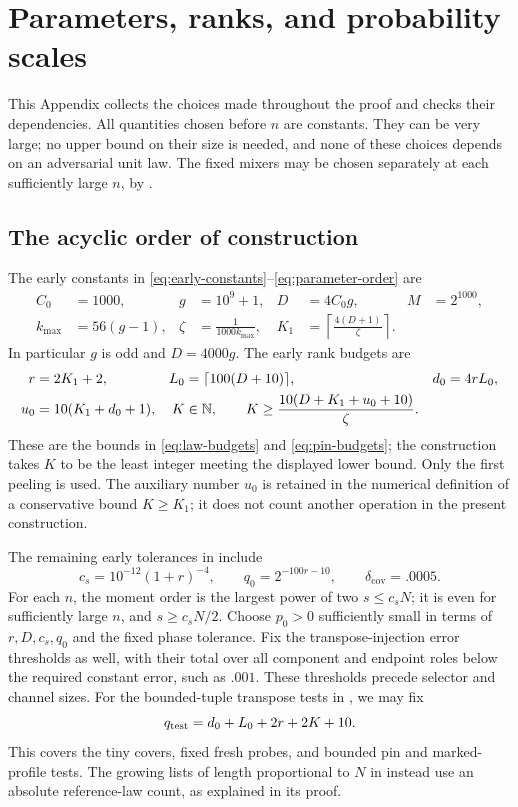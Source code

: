 \section{Parameters, ranks, and probability scales}
\label{sec:parameters}

This Appendix collects the choices made throughout the proof and
checks their dependencies. All quantities chosen before \(n\) are
constants. They can be very large; no upper bound on their size is
needed, and none of these choices depends on an adversarial unit law.
The fixed mixers may be chosen separately at each sufficiently large
\(n\), by .

\subsection{The acyclic order of construction}

The early constants in
\eqref{eq:early-constants}--\eqref{eq:parameter-order} are
\begin{align}
 C_0&=1000,& g&=10^9+1,&
 D&=4C_0g,& M&=2^{1000},\nonumber\\
 k_{\max}&=56(g-1),&
 \zeta&=\frac{1}{1000k_{\max}},&
 K_1&=\left\lceil\frac{4(D+1)}{\zeta}\right\rceil .
 \label{eq:ledger-early}
\end{align}
In particular \(g\) is odd and \(D=4000g\).
The early rank budgets are
\begin{align}
 r&=2K_1+2,&
 L_0&=\lceil100(D+10)\rceil,&
 d_0&=4rL_0,\nonumber\\
 u_0&=10(K_1+d_0+1),&
 K&\in\mathbb N,\qquad
 K\ge\frac{10(D+K_1+u_0+10)}{\zeta}.
 \label{eq:ledger-law}
\end{align}
These are the bounds in
\eqref{eq:law-budgets} and \eqref{eq:pin-budgets};
the construction takes \(K\) to be the least integer meeting
the displayed lower bound.  Only the first peeling is used.
The auxiliary number \(u_0\) is retained in the numerical definition
of a conservative bound \(K\ge K_1\); it does not count another
operation in the present construction.

The remaining early tolerances in
 include
\begin{equation}
 c_s=10^{-12}(1+r)^{-4},\qquad
 q_0=2^{-100r-10},\qquad
 \delta_{\mathrm{cov}}=.0005.
 \label{eq:ledger-cover-tolerances}
\end{equation}
For each \(n\), the moment order is the largest power of two
\(s\le c_sN\); it is even for sufficiently large \(n\), and
\(s\ge c_sN/2\).
Choose \(p_0>0\) sufficiently small in terms of \(r,D,c_s,q_0\)
and the fixed phase tolerance. Fix the transpose-injection error
thresholds as well, with their total over all component and endpoint
roles below the required constant error, such as \(.001\).
These thresholds precede selector and channel sizes.
For the bounded-tuple transpose tests in
, we may fix
\[
 q_{\rm test}=d_0+L_0+2r+2K+10.
\]
This covers the tiny covers, fixed fresh probes, and bounded pin
and marked-profile tests.  The growing lists of length proportional
to \(N\) in  instead use an absolute
reference-law count, as explained in its proof.

